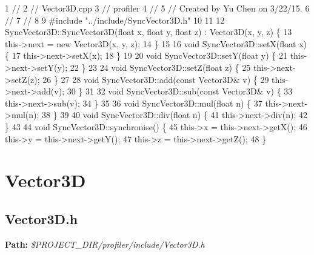 \begin{DoxyCodeInclude}
1 \textcolor{comment}{//}
2 \textcolor{comment}{//  Vector3D.cpp}
3 \textcolor{comment}{//  profiler}
4 \textcolor{comment}{//}
5 \textcolor{comment}{//  Created by Yu Chen on 3/22/15.}
6 \textcolor{comment}{//}
7 \textcolor{comment}{//}
8 
9 \textcolor{preprocessor}{#include "../include/SyncVector3D.h"}
10 
11 
12 SyncVector3D::SyncVector3D(\textcolor{keywordtype}{float} x, \textcolor{keywordtype}{float} y, \textcolor{keywordtype}{float} z) : Vector3D(x, y, z) \{
13     this->next = \textcolor{keyword}{new} Vector3D(x, y, z);
14 \}
15 
16 \textcolor{keywordtype}{void} SyncVector3D::setX(\textcolor{keywordtype}{float} x) \{
17     this->next->setX(x);
18 \}
19 
20 \textcolor{keywordtype}{void} SyncVector3D::setY(\textcolor{keywordtype}{float} y) \{
21     this->next->setY(y);
22 \}
23 
24 \textcolor{keywordtype}{void} SyncVector3D::setZ(\textcolor{keywordtype}{float} z) \{
25     this->next->setZ(z);
26 \}
27 
28 \textcolor{keywordtype}{void} SyncVector3D::add(\textcolor{keyword}{const} Vector3D& v) \{
29     this->next->add(v);
30 \}
31 
32 \textcolor{keywordtype}{void} SyncVector3D::sub(\textcolor{keyword}{const} Vector3D& v) \{
33     this->next->sub(v);
34 \}
35 
36 \textcolor{keywordtype}{void} SyncVector3D::mul(\textcolor{keywordtype}{float} n) \{
37     this->next->mul(n);
38 \}
39 
40 \textcolor{keywordtype}{void} SyncVector3D::div(\textcolor{keywordtype}{float} n) \{
41     this->next->div(n);
42 \}
43 
44 \textcolor{keywordtype}{void} SyncVector3D::synchronise() \{
45     this->x = this->next->getX();
46     this->y = this->next->getY();
47     this->z = this->next->getZ();
48 \}
\end{DoxyCodeInclude}
 \hypertarget{_benchmark_program_BenchmarkProgramVector3D}{}\section{Vector3\+D}\label{_benchmark_program_BenchmarkProgramVector3D}
\hypertarget{_benchmark_program_BenchmarkProgramVector3D_h}{}\subsection{Vector3\+D.\+h}\label{_benchmark_program_BenchmarkProgramVector3D_h}
{\bfseries Path\+:} {\itshape \$\+P\+R\+O\+J\+E\+C\+T\+\_\+\+D\+I\+R/profiler/include/\+Vector3\+D.h} 
